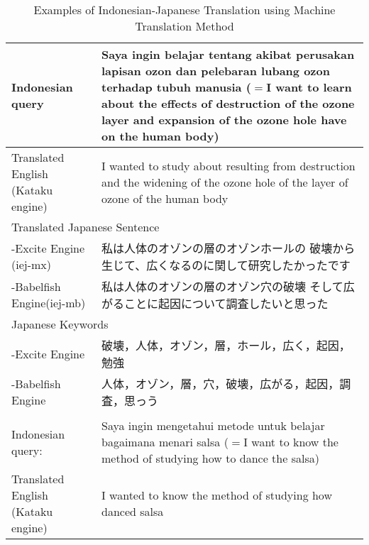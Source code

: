 \documentclass[english]{jnlp_1.3c}
\begin{document}
\begin{table}[t]
  \caption{Examples of Indonesian-Japanese Translation using Machine
 Translation Method}
  \label{table:6}
  \begin{center}
   \begin{tabular}{|l|l|}\hline
    \multicolumn{1}{|p{10em}|}{Indonesian query}
    &    \multicolumn{1}{|p{30em}|}{Saya ingin belajar tentang akibat
    perusakan lapisan ozon dan pelebaran lubang 
    ozon terhadap tubuh manusia ($=$I want to learn about the
    effects of destruction of the ozone layer and expansion of the ozone
    hole have on the human body)}   \\  \hline
    \multicolumn{1}{|p{10em}|}{Translated English (Kataku engine)}
    &    \multicolumn{1}{|p{30em}|}{I wanted to study about resulting
    from destruction and the widening of the ozone hole of the layer of
    ozone of the human body}   \\  \hline
    \multicolumn{2}{|l|}{Translated Japanese Sentence} \\ \hline
    \multicolumn{1}{|p{10em}|}{-Excite Engine (iej-mx)}
    &    \multicolumn{1}{|p{30em}|}{私は人体のオゾンの層のオゾンホールの
    破壊から生じて、広くなるのに関して研究したかったです}   \\  \hline
     \multicolumn{1}{|p{10em}|}{-Babelfish Engine(iej-mb)}
    &    \multicolumn{1}{|p{30em}|}{私は人体のオゾンの層のオゾン穴の破壊
    そして広がることに起因について調査したいと思った}   \\  \hline
     \multicolumn{2}{|l|}{Japanese Keywords} \\ \hline
     \multicolumn{1}{|p{10em}|}{-Excite Engine}
    &    \multicolumn{1}{|p{30em}|}{破壊，人体，オゾン，層，ホール，広く，起因，勉強}   \\  \hline
     \multicolumn{1}{|p{10em}|}{-Babelfish Engine}
    &    \multicolumn{1}{|p{30em}|}{人体，オゾン，層，穴，破壊，広がる，起因，調査，思っう}   \\  \hline
     \multicolumn{2}{|l|}{} \\ \hline
    \multicolumn{1}{|p{10em}|}{Indonesian query:}
    &    \multicolumn{1}{|p{30em}|}{Saya ingin mengetahui metode untuk
    belajar bagaimana menari salsa ($=$I want to know the method of
    studying how to dance the salsa)}   \\  \hline
    \multicolumn{1}{|p{10em}|}{Translated English (Kataku engine)}
    &    \multicolumn{1}{|p{30em}|}{I wanted to know the method of
    studying how danced salsa}   \\  \hline

\end{tabular}
\end{center}
\end{table}
\end{document}
